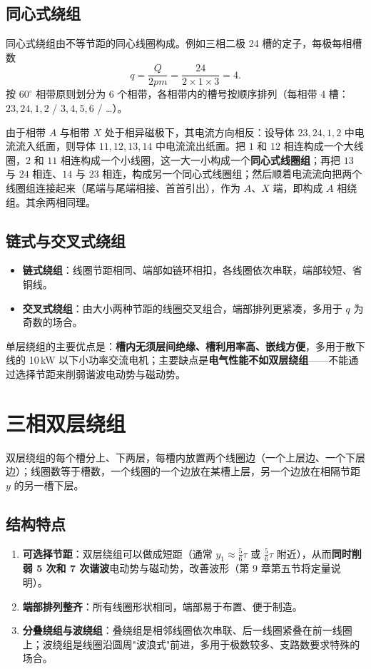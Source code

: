 \subsection{同心式绕组}
同心式绕组由不等节距的同心线圈构成。例如三相二极 24 槽的定子，每极每相槽数
\begin{equation}
q=\frac{Q}{2pm}=\frac{24}{2\times1\times3}=4 .
\end{equation}
按 $60^\circ$ 相带原则划分为 6 个相带，各相带内的槽号按顺序排列（每相带 4 槽：$23,24,1,2$ / $3,4,5,6$ / …）。

由于相带 $A$ 与相带 $X$ 处于相异磁极下，其电流方向相反：设导体 $23,24,1,2$ 中电流流入纸面，则导体 $11,12,13,14$ 中电流流出纸面。把 $1$ 和 $12$ 相连构成一个大线圈，$2$ 和 $11$ 相连构成一个小线圈，这一大一小构成一个\textbf{同心式线圈组}；再把 $13$ 与 $24$ 相连、$14$ 与 $23$ 相连，构成另一个同心式线圈组；然后顺着电流流向把两个线圈组连接起来（尾端与尾端相接、首首引出），作为 $A$、$X$ 端，即构成 $A$ 相绕组。其余两相同理。

\subsection{链式与交叉式绕组}
\begin{itemize}
  \item \textbf{链式绕组}：线圈节距相同、端部如链环相扣，各线圈依次串联，端部较短、省铜线。
  \item \textbf{交叉式绕组}：由大小两种节距的线圈交叉组合，端部排列更紧凑，多用于 $q$ 为奇数的场合。
\end{itemize}

单层绕组的主要优点是：\textbf{槽内无须层间绝缘、槽利用率高、嵌线方便}，多用于散下线的 10\,kW 以下小功率交流电机；主要缺点是\textbf{电气性能不如双层绕组}——不能通过选择节距来削弱谐波电动势与磁动势。

\section{三相双层绕组}

双层绕组的每个槽分上、下两层，每槽内放置两个线圈边（一个上层边、一个下层边）；线圈数等于槽数，一个线圈的一个边放在某槽上层，另一个边放在相隔节距 $y$ 的另一槽下层。

\subsection{结构特点}
\begin{enumerate}
  \item \textbf{可选择节距}：双层绕组可以做成短距（通常 $y_1\approx\tfrac56\tau$ 或 $\tfrac{5}{6}\tau$ 附近），从而\textbf{同时削弱 5 次和 7 次谐波}电动势与磁动势，改善波形（第 9 章第五节将定量说明）。
  \item \textbf{端部排列整齐}：所有线圈形状相同，端部易于布置、便于制造。
  \item \textbf{分叠绕组与波绕组}：叠绕组是相邻线圈依次串联、后一线圈紧叠在前一线圈上；波绕组是线圈沿圆周"波浪式"前进，多用于极数较多、支路数要求特殊的场合。
\end{enumerate}

